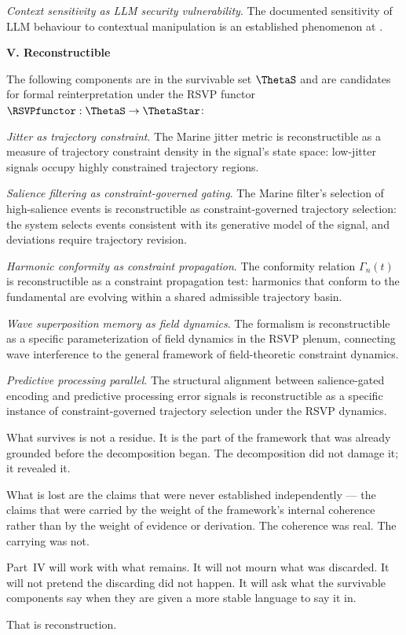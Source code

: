 \textit{Context sensitivity as LLM security vulnerability}.
The documented sensitivity of LLM behaviour to
contextual manipulation is an established phenomenon
at \LevelI{}.

\bigskip
\noindent\textbf{V. Reconstructible}

\medskip

The following components are in the survivable set
$\ThetaS$ and are candidates for formal reinterpretation
under the RSVP functor $\RSVPfunctor : \ThetaS \to \ThetaStar$:

\textit{Jitter as trajectory constraint}. The Marine
jitter metric is reconstructible as a measure of
trajectory constraint density in the signal's state
space: low-jitter signals occupy highly constrained
trajectory regions.

\textit{Salience filtering as constraint-governed gating}.
The Marine filter's selection of high-salience events
is reconstructible as constraint-governed trajectory
selection: the system selects events consistent with
its generative model of the signal, and deviations
require trajectory revision.

\textit{Harmonic conformity as constraint propagation}.
The conformity relation $\Gamma_n(t)$ is reconstructible
as a constraint propagation test: harmonics that
conform to the fundamental are evolving within a shared
admissible trajectory basin.

\textit{Wave superposition memory as field dynamics}.
The \MEMeight{} formalism is reconstructible as a
specific parameterization of field dynamics in the
RSVP plenum, connecting wave interference to the
general framework of field-theoretic constraint dynamics.

\textit{Predictive processing parallel}. The structural
alignment between salience-gated encoding and predictive
processing error signals is reconstructible as a specific
instance of constraint-governed trajectory selection
under the RSVP dynamics.

\bigskip

\begin{interlude}[]
  What survives is not a residue. It is the part of
  the framework that was already grounded before the
  decomposition began. The decomposition did not damage
  it; it revealed it.

  What is lost are the claims that were never established
  independently --- the claims that were carried by
  the weight of the framework's internal coherence
  rather than by the weight of evidence or derivation.
  The coherence was real. The carrying was not.

  Part~IV will work with what remains.
  It will not mourn what was discarded.
  It will not pretend the discarding did not happen.
  It will ask what the survivable components say
  when they are given a more stable language to say it in.

  That is reconstruction.
\end{interlude}
